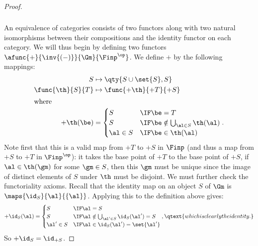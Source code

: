 \documentclass[main.tex]{subfiles}
\begin{document}
\begin{proof}
	\subparagraph{}
	An equivalence of categories consists of two functors along with two natural
	isomorphisms between their compositions and the identity functor on each
	category. We will thus begin by defining two functors
	\(\afunc{+}{\inv{(-)}}{\Gm}{\Finp^\op}\). We define \(+\) by the following
	mappings:
	\begin{align*}
		S&\mapsto\qty{S\cup\set{S},S} \\
		\func{\th}{S}{T}&\mapsto\func{+\th}{+T}{+S} \\
		\intertext{where}
		+\th(\be)&=\begin{cases}
			S        & \IF\be=T \\
			S        & \IF\be\notin\bigcup_{\al\in S}\th(\al) \\
			\al\in S & \IF\be\in\th(\al) \\
		\end{cases}.
	\end{align*}
	Note first that this is a valid map from \(+T\) to \(+S\) in \(\Finp\) (and
	thus a map from \(+S\) to \(+T\) in \(\Finp^\op\)): it takes the base point
	of \(+T\) to the base point of \(+S\), if \(\al\in\th(\gm)\) for some
	\(\gm\in S\), then this \(\gm\) must be unique since the image of distinct
	elements of \(S\) under \(\th\) must be disjoint. We must further check the
	functoriality axioms. Recall that the identity map on an object \(S\) of
	\(\Gm\) is \(\maps{\id_S}{\al}{\{\al\}}\). Applying this to the definition
	above gives:
	\[+\id_S(\al)=
		\begin{cases}
			S         & \IF\al=S \\
			S         & \IF\al\notin\bigcup_{\al'\in S}\id_S(\al')=S\\
			\al'\in S & \IF\al\in\id_S(\al')=\set{\al'} \\
		\end{cases},
	\qtext{which is clearly the identity.}\] So \(+\id_S=\id_{+S}\).


\end{proof}
\end{document}
